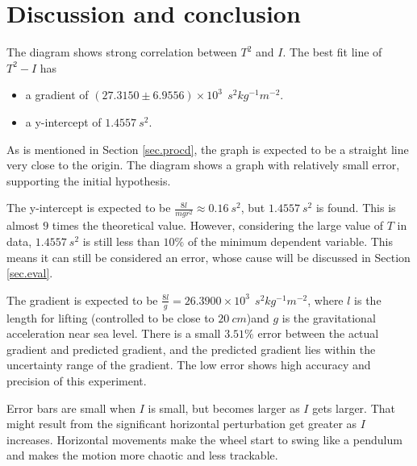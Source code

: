\documentclass[a4paper]{article}
\begin{document}
\section{Discussion and conclusion}


\label{sec.discussion}

The diagram shows strong correlation between $T^2$ and $I$. The best fit line of $T^2 - I$ has 

\begin{itemize}
    \item a gradient of $(27.3150 \pm 6.9556) \times 10^3\ \SI{}{s^2kg^{-1}m^{-2}}$.
    \item a y-intercept of $1.4557 \SI{}{s^2}$. %
\end{itemize}


As is mentioned in Section \ref{sec.procd}, the graph is expected to be a straight line very close to the origin. The diagram shows a graph with relatively small error, supporting the initial hypothesis.

The y-intercept is expected to be $\frac{8l}{mgr^2} \approx 0.16\SI{}{s^2}$, but $1.4557\SI{}{s^2}$ is found. This is almost $9$ times the theoretical value. However, considering the large value of $T$ in data, $1.4557\SI{}{s^2}$ is still less than $10\%$ of the minimum dependent variable. This means it can still be considered an error, whose cause will be discussed in Section \ref{sec.eval}.

The gradient is expected to be $\frac{8l}{g} = 26.3900 \times 10^3\ \SI{}{s^2kg^{-1}m^{-2}}$, where $l$ is the length for lifting (controlled to be close to $\SI{20}{cm}$)and $g$ is the gravitational acceleration near sea level. There is a small $3.51\%$ error between the actual gradient and predicted gradient, and the predicted gradient lies within the uncertainty range of the gradient. The low error shows high accuracy and precision of this experiment.

Error bars are small when $I$ is small, but becomes larger as $I$ gets larger. That might result from the significant horizontal perturbation get greater as $I$ increases. Horizontal movements make the wheel start to swing like a pendulum and makes the motion more chaotic and less trackable. 
\end{document}
